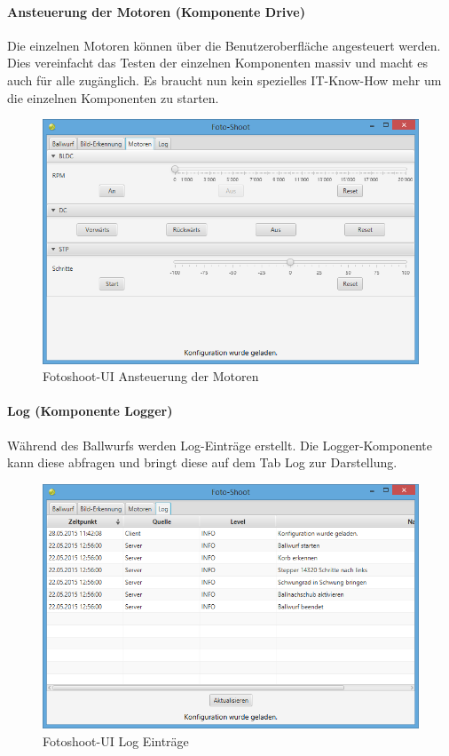\paragraph{Ansteuerung der Motoren (Komponente Drive)}
Die einzelnen Motoren können über die Benutzeroberfläche angesteuert werden. Dies vereinfacht das Testen der einzelnen Komponenten massiv und macht es auch für alle zugänglich. Es braucht nun kein spezielles IT-Know-How mehr um die einzelnen Komponenten zu starten.

\begin{figure}[h!]
	\centering
	\includegraphics[width=0.6\linewidth]{../../fig/fotoshoot-ui/fotoshoot-ui-motoren}
	\caption{Fotoshoot-UI Ansteuerung der Motoren}
	\label{fig:fotoshoot-ui-motoren}
\end{figure}

\paragraph{Log (Komponente Logger)}
Während des Ballwurfs werden Log-Einträge erstellt. Die Logger-Komponente kann diese abfragen und bringt diese auf dem Tab Log zur Darstellung.

\begin{figure}[h!]
	\centering
	\includegraphics[width=0.6\linewidth]{../../fig/fotoshoot-ui/fotoshoot-ui-log}
	\caption{Fotoshoot-UI Log Einträge}
	\label{fig:fotoshoot-ui-log}
\end{figure}

\newpage

